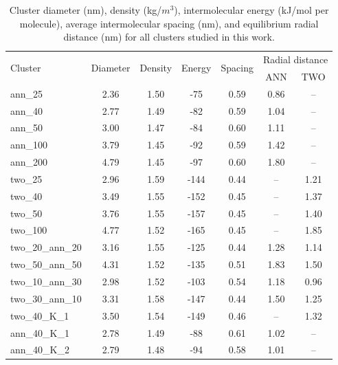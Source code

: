 %
\begin{table}[ht]
\centering
\caption{Cluster diameter (nm), density (kg/$m^3$), intermolecular energy (kJ/mol per molecule), average intermolecular spacing (nm), and equilibrium radial distance (nm) for all clusters studied in this work.} %
\label{table:maintable}
\begin{tabular}{lcccccc}
\hline
\multicolumn{1}{l}{\multirow{2}{*}{Cluster}} & \multicolumn{1}{c}{\multirow{2}{*}{Diameter}} & \multicolumn{1}{c}{\multirow{2}{*}{Density}} & \multicolumn{1}{c}{\multirow{2}{*}{Energy}} & \multicolumn{1}{c}{\multirow{2}{*}{Spacing}} & \multicolumn{2}{c}{Radial distance} \\ 
\multicolumn{1}{c}{} & \multicolumn{1}{c}{} & \multicolumn{1}{c}{} & \multicolumn{1}{c}{} & \multicolumn{1}{c}{} & \multicolumn{1}{c}{ANN} & \multicolumn{1}{c}{TWO} \\ \hline
ann\_25 & 2.36 & 1.50 & -75 & 0.59 &  \multicolumn{1}{c}{0.86} & -- \\
ann\_40 & 2.77 & 1.49 & -82 & 0.59 &  \multicolumn{1}{c}{1.04} & -- \\
ann\_50 & 3.00 & 1.47 & -84 & 0.60 &  \multicolumn{1}{c}{1.11} & -- \\
ann\_100 & 3.79 & 1.45 & -92 & 0.59 &  \multicolumn{1}{c}{1.42} & -- \\
ann\_200 & 4.79 & 1.45 & -97 & 0.60 &  \multicolumn{1}{c}{1.80} & -- \\ \hline
two\_25 & 2.96 & 1.59 & -144 & 0.44 &  \multicolumn{1}{c}{--} & 1.21 \\
two\_40 & 3.49 & 1.55 & -152 & 0.45 &  \multicolumn{1}{c}{--} & 1.37 \\
two\_50 & 3.76 & 1.55 & -157 & 0.45 &  \multicolumn{1}{c}{--} & 1.40 \\
two\_100 & 4.77 & 1.52 & -165 & 0.45 &  \multicolumn{1}{c}{--} & 1.85 \\ \hline
two\_20\_ann\_20 & 3.16 & 1.55 & -125 & 0.44 &  \multicolumn{1}{c}{1.28} & 1.14 \\
two\_50\_ann\_50 & 4.31 & 1.52 & -135 & 0.51 &  \multicolumn{1}{c}{1.83} & 1.50 \\
two\_10\_ann\_30 & 2.98 & 1.52 & -103 & 0.54 &  \multicolumn{1}{c}{1.18} & 0.96 \\
two\_30\_ann\_10 & 3.31 & 1.58 & -147 & 0.44 &  \multicolumn{1}{c}{1.50} & 1.25 \\ \hline
two\_40\_K\_1 & 3.50 & 1.54 & -149 & 0.46 &  \multicolumn{1}{c}{--} & 1.32 \\
ann\_40\_K\_1 & 2.78 & 1.49 & -88 & 0.61 &  \multicolumn{1}{c}{1.02} & -- \\
ann\_40\_K\_2 & 2.79 & 1.48 & -94 & 0.58 &  \multicolumn{1}{c}{1.01} & -- \\ \hline
\end{tabular}
\end{table}
%


